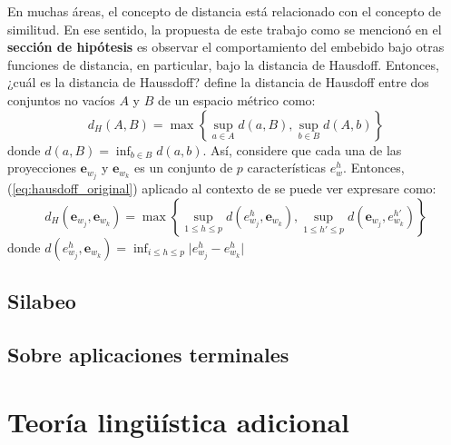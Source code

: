 En muchas áreas, el concepto de distancia está relacionado con el concepto de similitud. En ese sentido, la propuesta de este trabajo como se mencionó en el \textbf{sección de hipótesis} es observar el comportamiento del embebido bajo otras funciones de distancia, en particular, bajo la distancia de Hausdoff. Entonces, ¿cuál es la distancia de Haussdoff? \cite{munkres2000topolgy} define la distancia de Hausdoff entre dos conjuntos no vacíos $A$ y $B$ de un espacio métrico como:
\begin{equation}
	\label{eq:hausdoff_original}
	d_H\left(A,B\right) = \max \left\lbrace \sup_{a\in A} d(a,B),\sup_{b\in B}d(A,b)\right\rbrace
\end{equation}
donde $d(a,B) = \inf_{b\in B}d(a,b)$. Así, considere que cada una de las  proyecciones $\mathbf{e}_{w_j}$ y $\mathbf{e}_{w_k}$ es un conjunto de $p$ características $e_{w}^h$. Entonces, (\ref{eq:hausdoff_original}) aplicado al contexto de se puede ver expresare como:
\begin{equation}
	\label{eq:hausdoff_words}
	d_H\left(\mathbf{e}_{w_j},\mathbf{e}_{w_k}\right) = \max \left\lbrace \sup_{1\leq h\leq p} d(e_{w_j}^h,\mathbf{e}_{w_k}),\sup_{1 \leq h' \leq p}d(\mathbf{e}_{w_j},e_{w_k}^{h'})\right\rbrace
\end{equation}
donde $d(e_{w_j}^h,\mathbf{e}_{w_k}) = \inf_{i \leq h \leq p}\lvert e_{w_j}^h-e_{w_k}^h\rvert$

\subsection{Silabeo}


\subsection{Sobre aplicaciones terminales}


\section{Teoría lingüística adicional}


